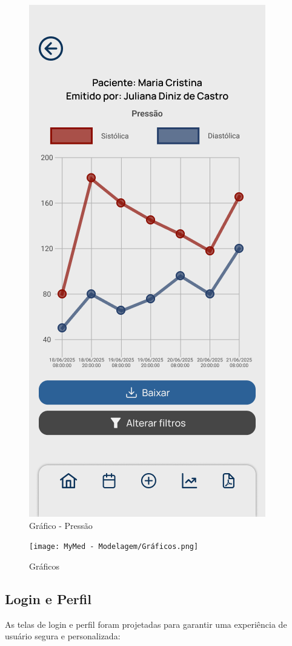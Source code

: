 \begin{figure}[!htbp]
	\centering
	\includegraphics[width=0.6\linewidth]{MyMed - Modelagem/Gráfico - Pressão.png}
	\caption{Gráfico - Pressão}
	\label{grafico_pressao}
\end{figure}

\begin{figure}[!htbp]
	\centering
	\texttt{[image: MyMed - Modelagem/Gráficos.png]}
	\caption{Gráficos}
	\label{graficos}
\end{figure}

\subsection{Login e Perfil}

As telas de login e perfil foram projetadas para garantir uma experiência de usuário segura e personalizada:


